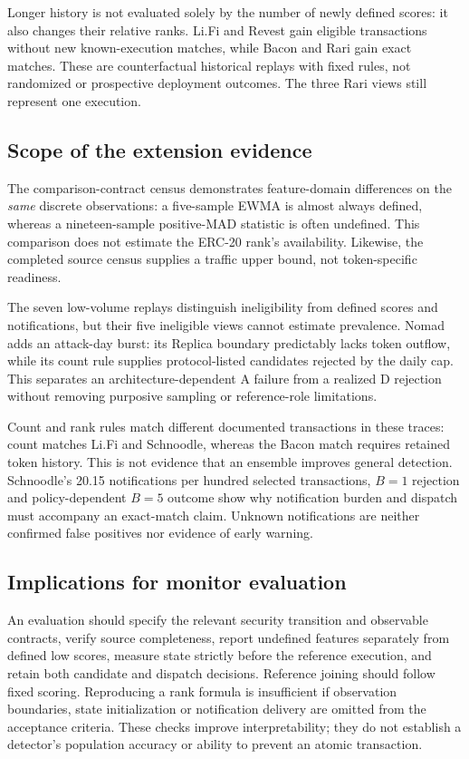 \documentclass[preprint,12pt,authoryear]{elsarticle}
\begin{document}
Longer history is not evaluated solely by the number of newly defined scores: it also changes their relative ranks. Li.Fi and Revest gain eligible transactions without new known-execution matches, while Bacon and Rari gain exact matches. These are counterfactual historical replays with fixed rules, not randomized or prospective deployment outcomes. The three Rari views still represent one execution.

\subsection{Scope of the extension evidence}\label{sec:transport}
The comparison-contract census demonstrates feature-domain differences on the \emph{same} discrete observations: a five-sample EWMA is almost always defined, whereas a nineteen-sample positive-MAD statistic is often undefined. This comparison does not estimate the ERC-20 rank's availability. Likewise, the completed source census supplies a traffic upper bound, not token-specific readiness.

The seven low-volume replays distinguish ineligibility from defined scores and notifications, but their five ineligible views cannot estimate prevalence. Nomad adds an attack-day burst: its Replica boundary predictably lacks token outflow, while its count rule supplies protocol-listed candidates rejected by the daily cap. This separates an architecture-dependent A failure from a realized D rejection without removing purposive sampling or reference-role limitations.

Count and rank rules match different documented transactions in these traces: count matches Li.Fi and Schnoodle, whereas the Bacon match requires retained token history. This is not evidence that an ensemble improves general detection. Schnoodle's 20.15 notifications per hundred selected transactions, $B=1$ rejection and policy-dependent $B=5$ outcome show why notification burden and dispatch must accompany an exact-match claim. Unknown notifications are neither confirmed false positives nor evidence of early warning.

\subsection{Implications for monitor evaluation}
An evaluation should specify the relevant security transition and observable contracts, verify source completeness, report undefined features separately from defined low scores, measure state strictly before the reference execution, and retain both candidate and dispatch decisions. Reference joining should follow fixed scoring. Reproducing a rank formula is insufficient if observation boundaries, state initialization or notification delivery are omitted from the acceptance criteria. These checks improve interpretability; they do not establish a detector's population accuracy or ability to prevent an atomic transaction.
\end{document}
